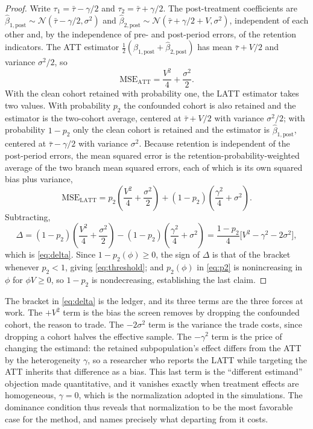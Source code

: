 \begin{proof}
Write $\tau_1=\bar\tau-\gamma/2$ and $\tau_2=\bar\tau+\gamma/2$. The post-treatment
coefficients are $\hat\beta_{1,\mathrm{post}}\sim\mathcal N(\bar\tau-\gamma/2,\sigma^2)$
and $\hat\beta_{2,\mathrm{post}}\sim\mathcal N(\bar\tau+\gamma/2+V,\sigma^2)$,
independent of each other and, by the independence of pre- and post-period errors, of
the retention indicators. The ATT estimator
$\tfrac12(\hat\beta_{1,\mathrm{post}}+\hat\beta_{2,\mathrm{post}})$ has mean
$\bar\tau+V/2$ and variance $\sigma^2/2$, so
\[
\mathrm{MSE}_{\mathrm{ATT}}=\frac{V^2}{4}+\frac{\sigma^2}{2}.
\]
With the clean cohort retained with probability one, the LATT estimator takes two
values. With probability $p_2$ the confounded cohort is also retained and the
estimator is the two-cohort average, centered at $\bar\tau+V/2$ with variance
$\sigma^2/2$; with probability $1-p_2$ only the clean cohort is retained and the
estimator is $\hat\beta_{1,\mathrm{post}}$, centered at $\bar\tau-\gamma/2$ with
variance $\sigma^2$. Because retention is independent of the post-period errors, the
mean squared error is the retention-probability-weighted average of the two branch
mean squared errors, each of which is its own squared bias plus variance,
\[
\mathrm{MSE}_{\mathrm{LATT}}
=p_2\!\left(\frac{V^2}{4}+\frac{\sigma^2}{2}\right)
+(1-p_2)\!\left(\frac{\gamma^2}{4}+\sigma^2\right).
\]
Subtracting,
\[
\Delta
=(1-p_2)\!\left(\frac{V^2}{4}+\frac{\sigma^2}{2}\right)
-(1-p_2)\!\left(\frac{\gamma^2}{4}+\sigma^2\right)
=\frac{1-p_2}{4}\big[V^2-\gamma^2-2\sigma^2\big],
\]
which is \eqref{eq:delta}. Since $1-p_2(\phi)\ge 0$, the sign of $\Delta$ is that of
the bracket whenever $p_2<1$, giving \eqref{eq:threshold}; and $p_2(\phi)$ in
\eqref{eq:p2} is nonincreasing in $\phi$ for $\phi V\ge 0$, so $1-p_2$ is
nondecreasing, establishing the last claim.
\end{proof}

The bracket in \eqref{eq:delta} is the ledger, and its three terms are the three
forces at work. The $+V^2$ term is the bias the screen removes by dropping the
confounded cohort, the reason to trade. The $-2\sigma^2$ term is the variance the
trade costs, since dropping a cohort halves the effective sample. The $-\gamma^2$ term
is the price of changing the estimand: the retained subpopulation's effect differs
from the ATT by the heterogeneity $\gamma$, so a researcher who reports the LATT while
targeting the ATT inherits that difference as a bias. This last term is the
``different estimand'' objection made quantitative, and it vanishes exactly when
treatment effects are homogeneous, $\gamma=0$, which is the normalization adopted in
the simulations. The dominance condition thus reveals that normalization to be the
most favorable case for the method, and names precisely what departing from it costs.

